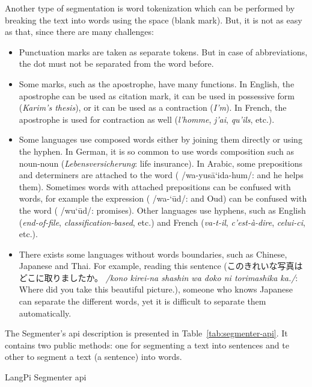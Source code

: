 Another type of segmentation is word tokenization which can be performed by breaking the text into words using the space (blank mark).
But, it is not as easy as that, since there are many challenges:
\begin{itemize}

	\item Punctuation marks are taken as separate tokens. But in case of abbreviations, the dot must not be separated from the word before.
	
	\item Some marks, such as the apostrophe, have many functions. 
	In English, the apostrophe can be used as citation mark, it can be used in possessive form (\textit{Karim's thesis}), or it can be used as a contraction (\textit{I'm}). 
	In French, the apostrophe is used for contraction as well (\textit{l'homme}, \textit{j'ai}, \textit{qu'ils}, etc.).
	
	\item Some languages use composed words either by joining them directly or using the hyphen. 
	In German, it is so common to use words composition such as noun-noun (\textit{Lebensversicherung}: life insurance).
	In Arabic, some prepositions and determiners are attached to the word ( /wa-yus\={a}`ida-hum/: and he helps them).
	Sometimes words with attached prepositions can be confused with words, for example the expression ( /wa-`\={u}d/: and Oud) can be confused with the word ( /wu`\={u}d/: promises).
	Other languages use hyphens, such as English (\textit{end-of-file}, \textit{classification-based}, etc.) and French (\textit{va-t-il}, \textit{c'est-à-dire}, \textit{celui-ci}, etc.). 
	
	\item There exists some languages without words boundaries, such as Chinese, Japanese and Thai. 
	For example, reading this sentence (このきれいな写真はどこに取りましたか。 \textit{/kono kirei-na shashin wa doko ni torimashika ka./}: Where did you take this beautiful picture.), someone who knows Japanese can separate the different words, yet it is difficult to separate them automatically.
	
\end{itemize}

The Segmenter's \ac{api} description is presented in Table~\ref{tab:segmenter-api}.
It contains two public methods: one for segmenting a text into sentences and te other to segment a text (a sentence) into words.
\begin{table}[!ht]
	\centering
	\caption{LangPi Segmenter \ac{api}}
	\label{tab:segmenter-api}
\end{table}

